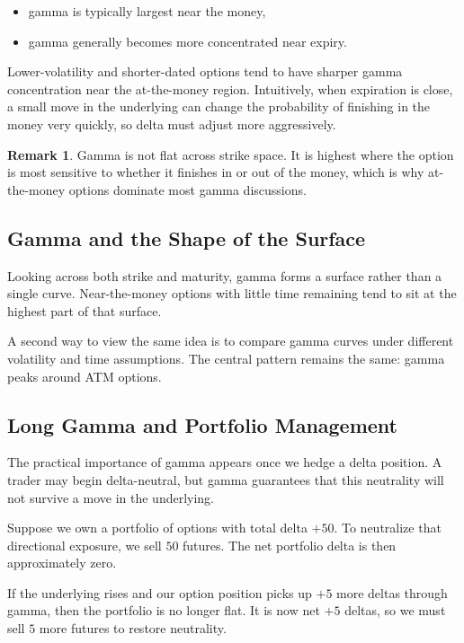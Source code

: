 \documentclass[11pt]{article}
\theoremstyle{definition}
\newtheorem{remark}{Remark}[section]
\begin{document}
\begin{itemize}[leftmargin=2em]
    \item gamma is typically largest near the money,
    \item gamma generally becomes more concentrated near expiry.
\end{itemize}

Lower-volatility and shorter-dated options tend to have sharper gamma concentration near the at-the-money region. Intuitively, when expiration is close, a small move in the underlying can change the probability of finishing in the money very quickly, so delta must adjust more aggressively.

\begin{remark}
Gamma is not flat across strike space. It is highest where the option is most sensitive to whether it finishes in or out of the money, which is why at-the-money options dominate most gamma discussions.
\end{remark}

\subsection{Gamma and the Shape of the Surface}

Looking across both strike and maturity, gamma forms a surface rather than a single curve. Near-the-money options with little time remaining tend to sit at the highest part of that surface.


A second way to view the same idea is to compare gamma curves under different volatility and time assumptions. The central pattern remains the same: gamma peaks around ATM options.

\subsection{Long Gamma and Portfolio Management}

The practical importance of gamma appears once we hedge a delta position. A trader may begin delta-neutral, but gamma guarantees that this neutrality will not survive a move in the underlying.

Suppose we own a portfolio of options with total delta \(+50\). To neutralize that directional exposure, we sell \(50\) futures. The net portfolio delta is then approximately zero.

If the underlying rises and our option position picks up \(+5\) more deltas through gamma, then the portfolio is no longer flat. It is now net \(+5\) deltas, so we must sell \(5\) more futures to restore neutrality.
\end{document}
